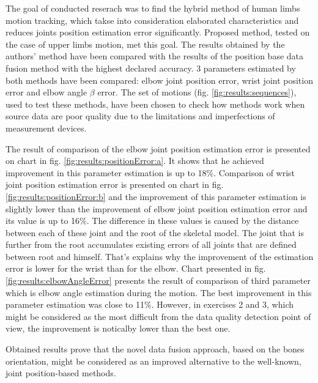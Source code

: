 \documentclass[sensors,article,submit,moreauthors,pdftex,10pt,a4paper]{mdpi}
\begin{document}
	The goal of conducted reserach was to find the hybrid method of human limbs motion tracking, which takse into consideration elaborated characteristics and reduces joints position estimation error significantly. Proposed method, tested on the case of upper limbs motion, met this goal. The results obtained by the authors' method have been compared with the results of the position base data fusion method with the highest declared accuracy. 3 parameters estimated by both methods have been compared: elbow joint position error, wrist joint position error and elbow angle $\beta$ error. The set of motions (fig. \ref{fig:results:sequences}), used to test these methods, have been chosen to check how methods work when source data are poor quality due to the limitations and imperfections of measurement devices.
	
	The result of comparison of the elbow joint position estimation error is presented on chart in fig. \ref{fig:results:positionError:a}. It shows that he achieved improvement in this parameter estimation is up to 18\%. Comparison of wrist joint position estimation error is presented on chart in fig. \ref{fig:results:positionError:b} and the improvement of this parameter estimation is slightly lower than the improvement of elbow joint position estimation error and its value is up to 16\%. The difference in these values is caused by the distance between each of these joint and the root of the skeletal model. The joint that is further from the root accumulates existing errors of all joints that are defined between root and himself. That's explains why the improvement of the estimation error is lower for the wrist than for the elbow. Chart presented in fig. \ref{fig:results:elbowAngleError} presents the result of comparison of third parameter which is elbow angle estimation during the motion. The best improvement in this parameter estimation was close to 11\%. However, in exercises 2 and 3, which might be considered as the most difficult from the data quality detection point of view, the improvement is noticalby lower than the best one.
	
	Obtained results prove that the novel data fusion approach, based on the bones orientation, might be considered as an improved alternative to the well-known, joint position-based methods.
		
		
	\vspace{6pt} 
		
		
\end{document}
